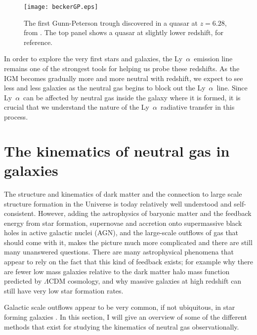 \documentclass[a4wide,12pt]{book}
\newcommand{\lya}{Ly~${\alpha}$}
\begin{document}
{\begin{figure}
   \centering
   \texttt{[image: beckerGP.eps]}
   \caption{The first Gunn-Peterson trough discovered in a quasar at $z = 6.28$, from \citet{becker-2001}. The top panel shows a quasar at slightly lower redshift, for reference.}
              \label{Fig:beckerGP}
    \end{figure}


In order to explore the very first stars and galaxies, the \lya\ emission line remains one of the strongest tools for helping us probe these redshifts. As the IGM becomes gradually more and more neutral with redshift, we expect to see less and less galaxies as the neutral gas begins to block out the \lya\ line. Since \lya\ can be affected by neutral gas inside the galaxy where it is formed, it is crucial that we understand the nature of the \lya\ radiative transfer in this process. 





\chapter{The kinematics of neutral gas in galaxies}

The structure and kinematics of dark matter and the connection to large scale structure formation in the Universe is today relatively well understood and self-consistent. However, adding the astrophysics of baryonic matter and the feedback energy from star formation, supernovae and accretion onto supermassive black holes in active galactic nuclei (AGN), and the large-scale outflows of gas that should come with it, makes the picture much more complicated and there are still many unanswered questions. There are many astrophysical phenomena that appear to rely on the fact that this kind of feedback exists; for example why there are fewer low mass galaxies relative to the dark matter halo mass function predicted by $\Lambda$CDM cosmology, and why massive galaxies at high redshift can still have very low star formation rates. 

Galactic scale outflows appear to be very common, if not ubiquitous, in star forming galaxies \citep[see e.g.][and references therein]{rupke-2002,rupke-2005,shapley-2003,martin2005,steidel-2010}. %
In this section, I will give an overview of some of the different methods that exist for studying the kinematics of neutral gas observationally. 

}
\end{document}
